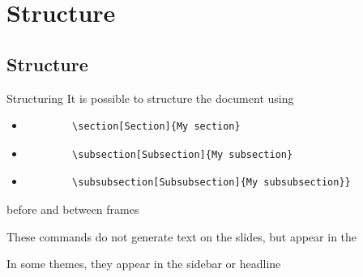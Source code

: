 \documentclass[xcolor=x11names, xcolor=table]{beamer}
\begin{document}
\section{Structure}
\subsection{Structure}
\begin{frame}[fragile]{Structuring}
    It is possible to structure the document using
    \begin{itemize}
        \item %
        \begin{verbatim}
        \section[Section]{My section}
        \end{verbatim}

        \item %
        \begin{verbatim}
        \subsection[Subsection]{My subsection}
        \end{verbatim}

        \item %
        \begin{verbatim}
        \subsubsection[Subsubsection]{My subsubsection}}
        \end{verbatim}
    \end{itemize}
    before and between frames

    \vspace{.5em}
    These commands do not generate text on the slides, but appear in the
    \texttt{\tableofcontents}

    \vspace{.5em}
    In some themes, they appear in the sidebar or headline
\end{frame}
\end{document}
